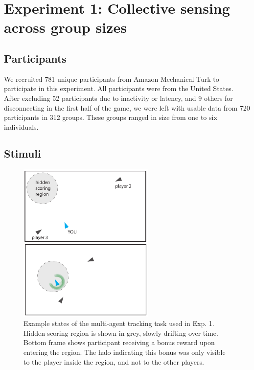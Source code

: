 \documentclass[12pt,letterpaper]{article}
\begin{document}




\section{Experiment 1: Collective sensing across group sizes}

\subsection{Participants}
We recruited 781 unique participants from Amazon Mechanical Turk to participate in this experiment.  All participants were from the United States.  After excluding 52 participants due to inactivity or latency, and 9 others for disconnecting in the first half of the game, we were left with usable data from 720 participants in 312 groups.  These groups ranged in size from one to six individuals. 

\subsection{Stimuli}

\begin{figure}[t!]
  \centering
  \includegraphics[width=0.6\textwidth]{./figures/experiment1_design.pdf}
  \hspace{0.1cm}
  \caption{Example states of the multi-agent tracking task used in Exp. 1. Hidden scoring region is shown in grey, slowly drifting over time. Bottom frame shows participant receiving a bonus reward upon entering the region. The halo indicating this bonus was only visible to the player inside the region, and not to the other players.}
  \label{fig:score}
\end{figure}
\end{document}
